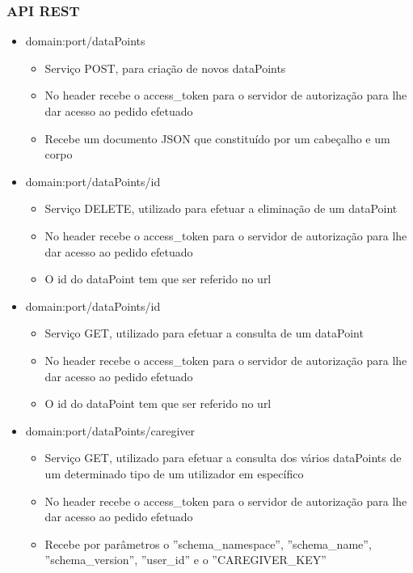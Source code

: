 \subsubsection{API REST}
\begin{itemize}
    \item domain:port/dataPoints
        \begin{itemize}
            \item Serviço POST, para criação de novos dataPoints
            \item No header recebe o access\_token para o servidor de autorização para lhe dar acesso ao pedido efetuado
            \item Recebe um documento JSON que constituído por um cabeçalho e um corpo
        \end{itemize}
    \item domain:port/dataPoints/id
        \begin{itemize}
            \item Serviço DELETE, utilizado para efetuar a eliminação de um dataPoint
            \item No header recebe o access\_token para o servidor de autorização para lhe dar acesso ao pedido efetuado
            \item O id do dataPoint tem que ser referido no url
        \end{itemize}
    \item domain:port/dataPoints/id
        \begin{itemize}
            \item Serviço GET, utilizado para efetuar a consulta de um dataPoint
            \item No header recebe o access\_token para o servidor de autorização para lhe dar acesso ao pedido efetuado
            \item O id do dataPoint tem que ser referido no url
        \end{itemize}
    \item domain:port/dataPoints/caregiver
        \begin{itemize}
            \item Serviço GET, utilizado para efetuar a consulta dos vários dataPoints de um determinado tipo de um utilizador em específico
            \item No header recebe o access\_token para o servidor de autorização para lhe dar acesso ao pedido efetuado
            \item Recebe por parâmetros o ''schema\_namespace'', ''schema\_name'', ''schema\_version'', ''user\_id'' e o ''CAREGIVER\_KEY''
        \end{itemize}
        
        
\end{itemize}  

